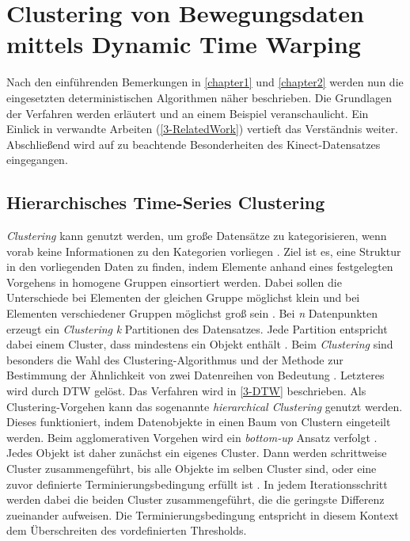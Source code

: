 \chapter{Clustering von Bewegungsdaten mittels Dynamic Time Warping}
\label{chapter3}

Nach den einführenden Bemerkungen in \autoref{chapter1} und \autoref{chapter2} werden nun
die eingesetzten deterministischen Algorithmen näher beschrieben.
Die Grundlagen der Verfahren werden erläutert und an einem Beispiel veranschaulicht.
Ein Einlick in verwandte Arbeiten (\autoref{3-RelatedWork}) vertieft das Verständnis weiter.
Abschließend wird auf zu beachtende Besonderheiten des Kinect-Datensatzes eingegangen.

\section{Hierarchisches Time-Series Clustering}
\label{3-Clustering}
\emph{Clustering} kann genutzt werden, um große Datensätze zu kategorisieren,
wenn vorab keine Informationen zu den Kategorien vorliegen \citep{aghabozorgi_time-series_2015}.
Ziel ist es, eine Struktur in den vorliegenden Daten zu finden,
indem Elemente anhand eines festgelegten Vorgehens in homogene Gruppen einsortiert werden.
Dabei sollen die Unterschiede bei Elementen der gleichen Gruppe möglichst klein
und bei Elementen verschiedener Gruppen möglichst groß sein \citep{aghabozorgi_time-series_2015, warren_liao_clustering_2005}.
Bei \emph{n} Datenpunkten erzeugt ein \emph{Clustering} \emph{k} Partitionen des Datensatzes.
Jede Partition entspricht dabei einem Cluster, dass mindestens ein Objekt enthält \citep{warren_liao_clustering_2005}.
Beim \emph{Clustering} sind besonders die Wahl des Clustering-Algorithmus
und der Methode zur Bestimmung der Ähnlichkeit von zwei Datenreihen von Bedeutung \citep{warren_liao_clustering_2005}.
Letzteres wird durch \ac{DTW} gelöst.
Das Verfahren wird in \autoref{3-DTW} beschrieben.
Als Clustering-Vorgehen kann das sogenannte \emph{hierarchical Clustering} genutzt werden.
Dieses funktioniert, indem Datenobjekte in einen Baum von Clustern eingeteilt werden.
Beim agglomerativen Vorgehen wird ein \emph{bottom-up} Ansatz verfolgt \citep{warren_liao_clustering_2005}.
Jedes Objekt ist daher zunächst ein eigenes Cluster.
Dann werden schrittweise Cluster zusammengeführt,
bis alle Objekte im selben Cluster sind,
oder eine zuvor definierte Terminierungsbedingung erfüllt ist \citep{warren_liao_clustering_2005}.
In jedem Iterationsschritt werden dabei die beiden Cluster zusammengeführt,
die die geringste Differenz zueinander aufweisen.
Die Terminierungsbedingung entspricht in diesem Kontext dem Überschreiten des vordefinierten Thresholds.

